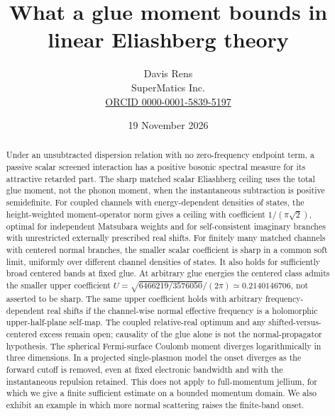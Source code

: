 \documentclass[11pt]{article}
\title{What a glue moment bounds in linear Eliashberg theory}
\author{Davis Rens\\SuperMatics Inc.\\ \href{https://orcid.org/0000-0001-5839-5197}{ORCID 0000-0001-5839-5197}}
\date{19 November 2026\ifstaged{\UNIVGLUEDOI}{\\[3pt]\small\UNIVGLUEDOI}{}}
\begin{document}
\maketitle
\begin{abstract}
Under an unsubtracted dispersion relation with no zero-frequency endpoint term, a passive scalar screened interaction has a positive bosonic spectral measure for its attractive retarded part. The sharp matched scalar Eliashberg ceiling uses the total glue moment, not the phonon moment, when the instantaneous subtraction is positive semidefinite. For coupled channels with energy-dependent densities of states, the height-weighted moment-operator norm gives a ceiling with coefficient $1/(\pi\sqrt2)$, optimal for independent Matsubara weights and for self-consistent imaginary branches with unrestricted externally prescribed real shifts. For finitely many matched channels with centered normal branches, the smaller scalar coefficient is sharp in a common soft limit, uniformly over different channel densities of states. It also holds for sufficiently broad centered bands at fixed glue. At arbitrary glue energies the centered class admits the smaller upper coefficient $U=\sqrt{6466219/3576050}/(2\pi)\simeq0.2140146706$, not asserted to be sharp. The same upper coefficient holds with arbitrary frequency-dependent real shifts if the channel-wise normal effective frequency is a holomorphic upper-half-plane self-map. The coupled relative-real optimum and any shifted-versus-centered excess remain open; causality of the glue alone is not the normal-propagator hypothesis. The spherical Fermi-surface Coulomb moment diverges logarithmically in three dimensions. In a projected single-plasmon model the onset diverges as the forward cutoff is removed, even at fixed electronic bandwidth and with the instantaneous repulsion retained. This does not apply to full-momentum jellium, for which we give a finite sufficient estimate on a bounded momentum domain. We also exhibit an example in which more normal scattering raises the finite-band onset.
\end{abstract}
\end{document}

